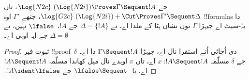 \documentclass[../../../include/open-logic-section]{subfiles}
\begin{document}


\begin{prop}
جے $\Log{N2c}\ (\Log{N2i}) \Proves
\Gamma \Sequent !A$، تاں $\Log{G2c}\ (\Log{N2i}) + \Cut \Proves \Gamma'
\Sequent \Delta$، جتھے $\Gamma'$ اوہ !!{formula}s دا بہُ-سیٹ اے جیہڑا $\Gamma$ توں نشان ہٹا کے ملدا اے، تے $\Delta = \{!A\}$ جے $!A$،~$\lfalse$ نہیں، تے $\Delta = \emptyset$ جے ایہ اوہی اے۔
\end{prop}

\begin{proof}
ثبوت فیر !!{proof}~$\delta$ دی اُچائی اُتے استقرا نال اے، جیہڑا $\Gamma \Sequent !A$ دا اے۔ جے $\delta$ مسلّمہ $x:!A \Sequent !A$ اے، تاں $\pi$ اوہدے نال میل کھاندا مسلّمہ $!A \Sequent !A$ اے، یا $\lfalse \Sequent \ $ جے $!A \ident \lfalse$۔


\end{proof}
\end{document}
